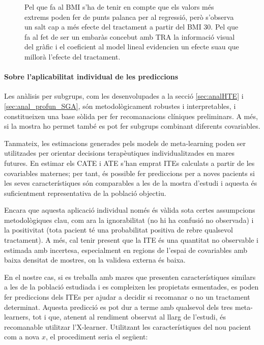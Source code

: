 \documentclass[../main.tex]{subfiles}
\begin{document}
\begin{figure}[H]
\begin{minipage}[t]{0.48\textwidth}
        \captionsetup{font=footnotesize}
        \caption{Pel que fa al BMI s'ha de tenir en compte que els valors més extrems poden fer de punts palanca per al regressió, però s'observa un salt cap a més efecte del tractament a partir del BMI 30. Pel que fa al fet de ser un embaràs concebut amb TRA la informació visual del gràfic i el coeficient al model lineal evidencien un efecte suau que millorà l'efecte del tractament.}
        \label{plot:PE3}
      \end{minipage}
    \end{figure}


    
    \paragraph{Sobre l’aplicabilitat individual de les prediccions} Les anàlisis per subgrups, com les desenvolupades a la secció \ref{sec:analHTE} i \ref{sec:anal_profun_SGA}, són metodològicament robustes i interpretables, i constitueixen una base sòlida per fer recomanacions clíniques preliminars. A més, si la mostra ho permet també es pot fer subgrups combinant diferents covariables.\par
    Tanmateix, les estimacions generades pels models de meta-learning poden ser utilitzades per orientar decisions terapèutiques individualitzades en mares futures. En estimar els CATE i ATE s’han emprat ITEs calculats a partir de les covariables maternes; per tant, és possible fer prediccions per a noves pacients si les seves característiques són comparables a les de la mostra d’estudi i aquesta és suficientment representativa de la població objectiu.\par
    Encara que aquesta aplicació individual només és vàlida sota certes assumpcions metodològiques clau, com ara la ignorabilitat (no hi ha confusió no observada) i la positivitat (tota pacient té una probabilitat positiva de rebre qualsevol tractament). A més, cal tenir present que la ITE és una quantitat no observable i estimada amb incertesa, especialment en regions de l'espai de covariables amb baixa densitat de mostres, on la validesa externa és baixa.\par
    En el nostre cas, si es treballa amb mares que presenten característiques similars a les de la població estudiada i es compleixen les propietats esmentades, es poden fer prediccions dels ITEs per ajudar a decidir si recomanar o no un tractament determinat. Aquesta predicció es pot dur a terme amb qualsevol dels tres meta-learners, tot i que, atenent al rendiment observat al llarg de l’estudi, és recomanable utilitzar l’X-learner. Utilitzant les característiques del nou pacient com a nova $x$, el procediment seria el següent:
\end{document}
